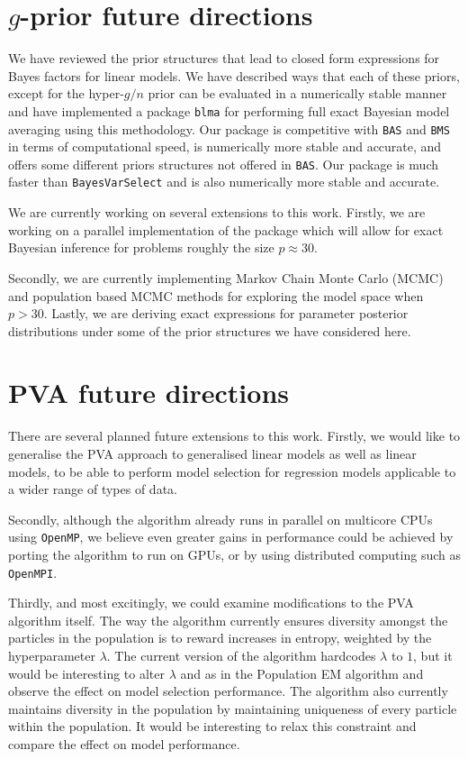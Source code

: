 \section{$g$-prior future directions}

We have reviewed the prior structures that lead to closed form expressions for
Bayes factors for linear models. We have described ways that each of these
priors, except for the hyper-$g/n$ prior can be evaluated in a numerically stable
manner and have implemented a package \texttt{blma} for performing full exact
Bayesian model averaging using this methodology. Our package is competitive
with \texttt{BAS} and \texttt{BMS} in terms of computational speed, is
numerically more stable and accurate, and offers some different priors
structures not offered in \texttt{BAS}. Our package is much faster than
\texttt{BayesVarSelect} and is also numerically more stable and accurate.

We are currently working on several extensions to this work. Firstly, we are
working on a parallel implementation of the package which will allow for exact
Bayesian inference for problems roughly the size $p\approx 30$.

Secondly, we are currently implementing  Markov Chain Monte Carlo (MCMC) and
population based MCMC methods for exploring the model space when $p>30$.
Lastly, we are deriving exact expressions for parameter posterior distributions
under some of the prior structures we have considered here.

\section{PVA future directions}

There are several planned future extensions to this work. Firstly, we would
like to generalise the PVA approach to generalised linear models as well as
linear models, to be able to perform model selection for regression models
applicable to a wider range of types of data.

Secondly, although the algorithm already runs in parallel on multicore CPUs
using \texttt{OpenMP}, we believe even greater gains in performance could be
achieved by porting the algorithm to run on GPUs, or by using distributed
computing such as \texttt{OpenMPI}.

Thirdly, and most excitingly, we could examine modifications to the PVA
algorithm itself. The way the algorithm currently ensures diversity amongst the
particles in the population is to reward increases in entropy, weighted by the
hyperparameter $\lambda$. The current version of the algorithm hardcodes
$\lambda$ to $1$, but it would be interesting to alter $\lambda$ and as in the
Population EM algorithm \cite{Tan2018} and observe the effect on model
selection performance. The algorithm also currently maintains diversity in the
population by maintaining uniqueness of every particle within the population.
It would be interesting to relax this constraint and compare the effect on
model performance.
